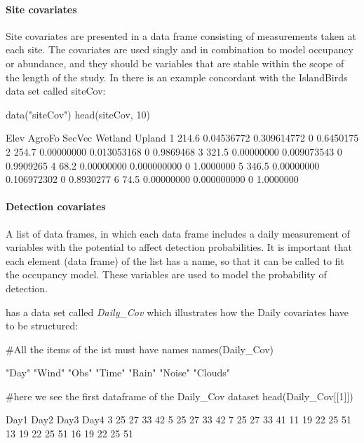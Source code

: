 \documentclass[article]{jss}
\begin{document}
\paragraph{Site covariates}\label{site-covariates}

Site covariates are presented in a data frame consisting of measurements
taken at each site. The covariates are used singly and in combination to
model occupancy or abundance, and they should be variables that are
stable within the scope of the length of the study. In
 there is an example concordant with the
IslandBirds data set called siteCov:

\begin{CodeChunk}
\begin{CodeInput}
data("siteCov")
head(siteCov, 10)
\end{CodeInput}
\end{CodeChunk}

\begin{CodeChunk}
\begin{CodeOutput}
   Elev     AgroFo      SecVec Wetland    Upland
1 214.6 0.04536772 0.309614772       0 0.6450175
2 254.7 0.00000000 0.013053168       0 0.9869468
3 321.5 0.00000000 0.009073543       0 0.9909265
4  68.2 0.00000000 0.000000000       0 1.0000000
5 346.5 0.00000000 0.106972302       0 0.8930277
6  74.5 0.00000000 0.000000000       0 1.0000000
\end{CodeOutput}
\end{CodeChunk}

\paragraph{Detection covariates}\label{detection-covariates}

A list of data frames, in which each data frame includes a daily
measurement of variables with the potential to affect detection
probabilities. It is important that each element (data frame) of the
list has a name, so that it can be called to fit the occupancy model.
These variables are used to model the probability of detection.

 has a data set called \emph{Daily\_Cov} which
illustrates how the Daily covariates have to be structured:

\begin{CodeChunk}
\begin{CodeInput}
#All the items of the ist must have names
names(Daily_Cov)
\end{CodeInput}
\begin{CodeOutput}
[1] "Day"    "Wind"   "Obs"    "Time"   "Rain"   "Noise"  "Clouds"
\end{CodeOutput}
\begin{CodeInput}
#here we see the first dataframe of the Daily_Cov dataset
head(Daily_Cov[[1]])
\end{CodeInput}
\begin{CodeOutput}
   Day1 Day2 Day3 Day4
3    25   27   33   42
5    25   27   33   42
7    25   27   33   41
11   19   22   25   51
13   19   22   25   51
16   19   22   25   51
\end{CodeOutput}
\end{CodeChunk}
\end{document}
